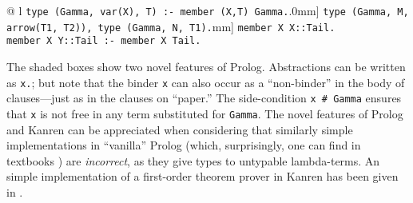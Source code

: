 \begin{isabellebody}
\begin{isamarkuptext}
  
  \begin{center}
  \begin{tabular}{@ {}l}
  {\hspace{4.3mm}\tt type (Gamma, var(X), T) :- member (X,T) Gamma.}\0.0mm]
  {\hspace{1.2cm}\tt       type (Gamma, M, arrow(T1, T2)), type (Gamma, N, T1).}\4mm]
  {\hspace{4.3mm}\tt member X X::Tail.}\\
  {\hspace{4.3mm}\tt member X Y::Tail :- member X Tail.}\\
  \end{tabular}
  \end{center}

  \noindent
  The shaded boxes show two novel features of Prolog.  Abstractions can
  be written as {\tt x.}; but note that the binder {\tt x} can also occur
  as a ``non-binder'' in the body of clauses---just as in the clauses on
  ``paper.''  The side-condition {\tt x\,\#\,Gamma} ensures that {\tt x} is not
  free in any term substituted for {\tt Gamma}. The novel features of
  Prolog and Kanren can be appreciated when considering that similarly simple
  implementations in ``vanilla'' Prolog (which, surprisingly, one can find in textbooks 
  \cite{Mitchell03}) are
  \emph{incorrect}, as they give types to untypable lambda-terms. An 
  simple implementation of a first-order theorem prover in Kanren
  has been given in \cite{alphaleantap08}.



\end{isamarkuptext}
\end{isabellebody}
